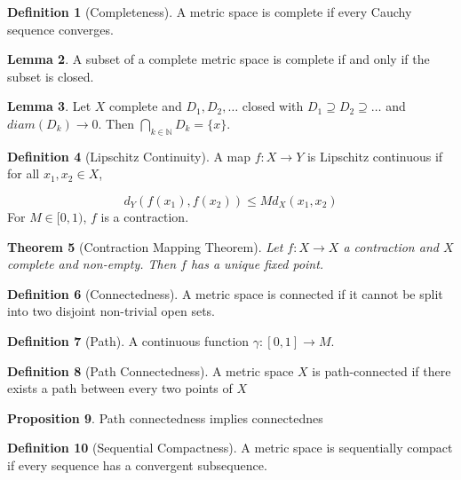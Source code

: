 \documentclass[11pt,a4paper, titlepage]{article}
\newtheorem{theorem}{Theorem}[section]
\theoremstyle{definition}
\newtheorem{definition}[theorem]{Definition}
\newtheorem{lemma}[theorem]{Lemma}
\newtheorem{proposition}[theorem]{Proposition}
\begin{document}
\begin{definition}[Completeness]
A metric space is complete if every Cauchy sequence converges.
\end{definition}

\begin{lemma}
A subset of a complete metric space is complete if and only if the subset is closed.
\end{lemma}

\begin{lemma}
Let $X$ complete and $D_1, D_2, \ldots$ closed with $D_1 \supseteq D_2 \supseteq \ldots$ and $diam(D_k) \to 0$. Then $\bigcap_{k \in \mathbb{N}} D_k = \{x\}$.
\end{lemma}

\begin{definition}[Lipschitz Continuity]
A map $f \colon X \longrightarrow Y$ is Lipschitz continuous if for all $x_1, x_2 \in X$,

\[
	d_Y(f(x_1),f(x_2)) \leqslant M d_X(x_1,x_2)
\]
For $M \in [0,1)$, $f$ is a contraction.
\end{definition}

\begin{theorem}[Contraction Mapping Theorem]
Let $f \colon X \longrightarrow X$ a contraction and $X$ complete and non-empty. Then $f$ has a unique fixed point.
\end{theorem}

\begin{definition}[Connectedness]
A metric space is connected if it cannot be split into two disjoint non-trivial open sets.
\end{definition}

\begin{definition}[Path]
A continuous function $\gamma \colon [0,1] \longrightarrow M$.
\end{definition}

\begin{definition}[Path Connectedness]
A metric space $X$ is path-connected if there exists a path between every two points of $X$
\end{definition}

\begin{proposition}
Path connectedness implies connectednes
\end{proposition}

\begin{definition}[Sequential Compactness]
A metric space is sequentially compact if every sequence has a convergent subsequence.
\end{definition}
\end{document}
